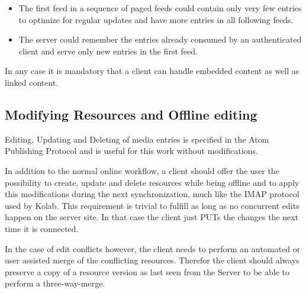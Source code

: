 \documentclass[12pt,a4paper,twoside]{scrartcl}		%
\newcommand{\citeurl}[2]{\url{#1} (#2)}
\begin{document}
\begin{itemize}
\item The first feed in a sequence of paged feeds could contain only very few
  entries to optimize for regular updates and have more entries in all following
  feeds.
\item The server could remember the entries already consumed by an authenticated
  client and serve only new entries in the first feed.
\end{itemize}

In any case it is mandatory that a client can handle embedded content as well as
linked content.

\subsection{Modifying Resources and Offline editing}

Editing, Updating and Deleting of media entries is specified in the Atom
Publishing Protocol and is useful for this work without modifications.


In addition to the normal online workflow, a client should offer the user the
possibility to create, update and delete resources while being offline and to
apply this modifications during the next synchronization, much like the IMAP
protocol used by Kolab. This requirement is trivial to fulfill as long as no
concurrent edits happen on the server site. In that case the client just PUTs
the changes the next time it is connected.

In the case of edit conflicts however, the client needs to perform an automated
or user assisted merge of the conflicting resources. Therefor the client should
always preserve a copy of a resource version as last seen from the Server to be
able to perform a three-way-merge.
\end{document}
